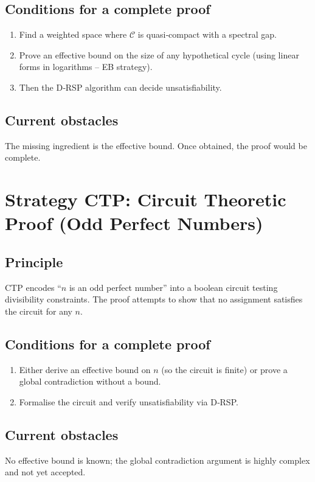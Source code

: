 \documentclass[11pt,a4paper]{article}
\begin{document}
\subsection{Conditions for a complete proof}
\begin{enumerate}
\item Find a weighted space where \(\mathcal{C}\) is quasi‑compact with a spectral gap.
\item Prove an effective bound on the size of any hypothetical cycle (using linear forms in logarithms – EB strategy).
\item Then the D‑RSP algorithm can decide unsatisfiability.
\end{enumerate}

\subsection{Current obstacles}
The missing ingredient is the effective bound. Once obtained, the proof would be complete.

\section{Strategy CTP: Circuit Theoretic Proof (Odd Perfect Numbers)}

\subsection{Principle}
CTP encodes “\(n\) is an odd perfect number” into a boolean circuit testing divisibility constraints. The proof attempts to show that no assignment satisfies the circuit for any \(n\).

\subsection{Conditions for a complete proof}
\begin{enumerate}
\item Either derive an effective bound on \(n\) (so the circuit is finite) or prove a global contradiction without a bound.
\item Formalise the circuit and verify unsatisfiability via D‑RSP.
\end{enumerate}

\subsection{Current obstacles}
No effective bound is known; the global contradiction argument is highly complex and not yet accepted.
\end{document}
